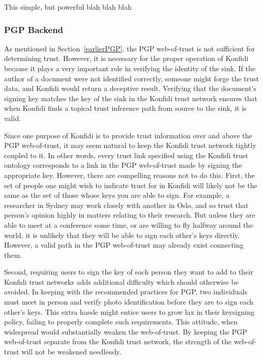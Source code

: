 \documentclass{acm_proc_article-sp}
\begin{document}
This simple, but powerful blah blah blah

\subsubsection{PGP Backend}
As mentioned in Section~\ref{earlierPGP}, the PGP web-of-trust is not sufficient for determining trust.  However, it is necessary for the proper operation of Konfidi because it plays a very important role in verifying the identity of the sink.  If the author of a document were not identified correctly, someone might forge the trust data, and Konfidi would return a deceptive result.  Verifying that the document's signing key matches the key of the sink in the Konfidi trust network ensures that when Konfidi finds a topical trust inference path from source to the sink, it is valid.

Since one purpose of Konfidi is to provide trust information over and above the PGP web-of-trust, it may seem natural to keep the Konfidi trust network tightly coupled to it.  In other words, every trust link specified using the Konfidi trust ontology corresponds to a link in the PGP web-of-trust made by signing the appropriate key.  However, there are compelling reasons not to do this.  First, the set of people one might wish to indicate trust for in Konfidi will likely not be the same as the set of those whose keys you are able to sign.  For example, a researcher in Sydney may work closely with another in Oslo, and so trust that person's opinion highly in matters relating to their research.  But unless they are able to meet at a conference some time, or are willing to fly halfway around the world, it is unlikely that they will be able to sign each other's keys directly.  However, a valid path in the PGP web-of-trust may already exist connecting them.

Second, requiring users to sign the key of each person they want to add to their Konfidi trust networks adds additional difficulty which should otherwise be avoided.  In keeping with the recommended practices for PGP, two individuals must meet in person and verify photo identification before they are to sign each other's keys.  This extra hassle might entice users to grow lax in their keysigning policy, failing to properly complete such requirements.  This attitude, when widespread would substantially weaken the web-of-trust.  By keeping the PGP web-of-trust separate from the Konfidi trust network, the strength of the web-of-trust will not be weakened needlessly.
\end{document}
